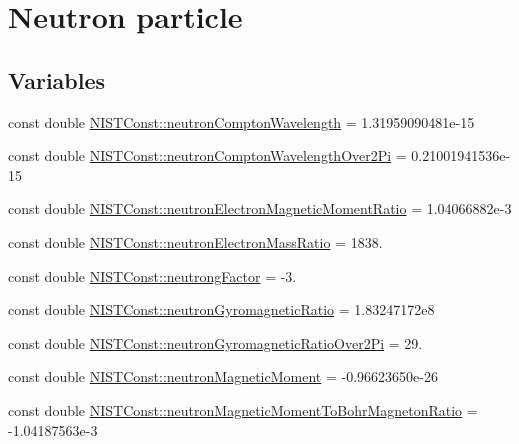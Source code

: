 \hypertarget{group___n_i_s_t_const-_neutron}{}\section{Neutron particle}
\label{group___n_i_s_t_const-_neutron}
\subsection*{Variables}
\begin{DoxyCompactItemize}
\item 
const double \mbox{\hyperlink{group___n_i_s_t_const-_neutron_ga769ac3bb36b199f820b5d2974d63f897}{N\+I\+S\+T\+Const\+::neutron\+Compton\+Wavelength}} = 1.\+31959090481e-\/15
\item 
const double \mbox{\hyperlink{group___n_i_s_t_const-_neutron_ga296bbfcb4bd095c1167efa636898632c}{N\+I\+S\+T\+Const\+::neutron\+Compton\+Wavelength\+Over2\+Pi}} = 0.\+21001941536e-\/15
\item 
const double \mbox{\hyperlink{group___n_i_s_t_const-_neutron_ga3aab0a26b37b5116b3861164274b599b}{N\+I\+S\+T\+Const\+::neutron\+Electron\+Magnetic\+Moment\+Ratio}} = 1.\+04066882e-\/3
\item 
const double \mbox{\hyperlink{group___n_i_s_t_const-_neutron_gab348dce51150510468de9d4aa9dece17}{N\+I\+S\+T\+Const\+::neutron\+Electron\+Mass\+Ratio}} = 1838.
\item 
const double \mbox{\hyperlink{group___n_i_s_t_const-_neutron_gac96a82ff7cb2cf20cb9cfe754756c08e}{N\+I\+S\+T\+Const\+::neutrong\+Factor}} = -\/3.
\item 
const double \mbox{\hyperlink{group___n_i_s_t_const-_neutron_gaa36e892cf37340a9122574e4a957570d}{N\+I\+S\+T\+Const\+::neutron\+Gyromagnetic\+Ratio}} = 1.\+83247172e8
\item 
const double \mbox{\hyperlink{group___n_i_s_t_const-_neutron_ga66ce4219c0fa9d7e9050e5bef3cb743c}{N\+I\+S\+T\+Const\+::neutron\+Gyromagnetic\+Ratio\+Over2\+Pi}} = 29.
\item 
const double \mbox{\hyperlink{group___n_i_s_t_const-_neutron_ga42a101bcaf7105edbfd6c06de9633d22}{N\+I\+S\+T\+Const\+::neutron\+Magnetic\+Moment}} = -\/0.\+96623650e-\/26
\item 
const double \mbox{\hyperlink{group___n_i_s_t_const-_neutron_ga01b6142f2d5dd4cd6ff10d2938a312cf}{N\+I\+S\+T\+Const\+::neutron\+Magnetic\+Moment\+To\+Bohr\+Magneton\+Ratio}} = -\/1.\+04187563e-\/3
\item 

\end{DoxyCompactItemize}
